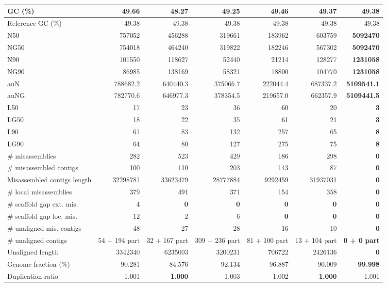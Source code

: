 \documentclass[12pt,a4paper]{article}
\begin{document}
\begin{table}[ht]
\begin{center}
\begin{tabular}{|l*{6}{|r}|}
GC (\%) & 49.66 & 48.27 & 49.25 & 49.46 & 49.37 & 49.38 \\ \hline
Reference GC (\%) & 49.38 & 49.38 & 49.38 & 49.38 & 49.38 & 49.38 \\ \hline
N50 & 757052 & 456288 & 319661 & 183962 & 603759 & {\bf 5092470} \\ \hline
NG50 & 754018 & 464240 & 319822 & 182246 & 567302 & {\bf 5092470} \\ \hline
N90 & 101550 & 118627 & 52440 & 21214 & 128277 & {\bf 1231058} \\ \hline
NG90 & 86985 & 138169 & 58321 & 18800 & 104770 & {\bf 1231058} \\ \hline
auN & 788682.2 & 640440.3 & 375066.7 & 222044.4 & 687337.2 & {\bf 5109541.1} \\ \hline
auNG & 782770.6 & 646977.3 & 378354.5 & 219657.0 & 662357.9 & {\bf 5109441.5} \\ \hline
L50 & 17 & 23 & 36 & 60 & 20 & {\bf 3} \\ \hline
LG50 & 18 & 22 & 35 & 61 & 21 & {\bf 3} \\ \hline
L90 & 61 & 83 & 132 & 257 & 65 & {\bf 8} \\ \hline
LG90 & 64 & 80 & 127 & 275 & 75 & {\bf 8} \\ \hline
\# misassemblies & 282 & 523 & 429 & 186 & 298 & {\bf 0} \\ \hline
\# misassembled contigs & 100 & 110 & 203 & 143 & 87 & {\bf 0} \\ \hline
Misassembled contigs length & 32298781 & 33623479 & 28777884 & 9292459 & 31937031 & {\bf 0} \\ \hline
\# local misassemblies & 379 & 491 & 371 & 154 & 358 & {\bf 0} \\ \hline
\# scaffold gap ext. mis. & 4 & {\bf 0} & {\bf 0} & {\bf 0} & {\bf 0} & {\bf 0} \\ \hline
\# scaffold gap loc. mis. & 12 & 2 & 6 & {\bf 0} & {\bf 0} & {\bf 0} \\ \hline
\# unaligned mis. contigs & 48 & 27 & 28 & 16 & 10 & {\bf 0} \\ \hline
\# unaligned contigs & 54 + 194 part & 32 + 167 part & 309 + 236 part & 81 + 100 part & 13 + 104 part & {\bf 0 + 0 part} \\ \hline
Unaligned length & 3342340 & 6235003 & 3200231 & 706722 & 2426136 & {\bf 0} \\ \hline
Genome fraction (\%) & 90.281 & 84.576 & 92.134 & 96.887 & 90.009 & {\bf 99.998} \\ \hline
Duplication ratio & 1.001 & {\bf 1.000} & 1.003 & 1.002 & {\bf 1.000} & 1.001 \\ \hline

\end{tabular}
\end{center}
\end{table}
\end{document}
